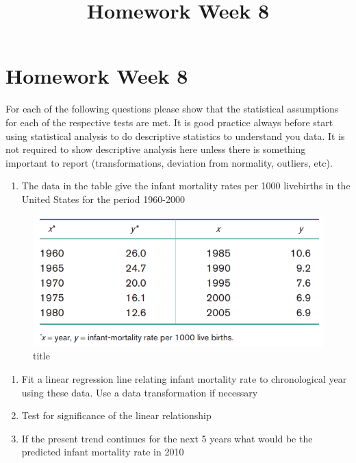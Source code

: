 \documentclass[11pt]{article}
\title{Homework Week 8}
\makeatletter
\def\maxwidth{\ifdim\Gin@nat@width>\linewidth\linewidth
    \else\Gin@nat@width\fi}
\let\Oldincludegraphics\includegraphics
\renewcommand{\includegraphics}[1]{\Oldincludegraphics[width=.8\maxwidth]{#1}}
\providecommand{\tightlist}{%
      \setlength{\itemsep}{0pt}\setlength{\parskip}{0pt}}
\makeatother
\begin{document}
    
    
    \maketitle
    
    

    
    \hypertarget{homework-week-8}{%
\section{Homework Week 8}\label{homework-week-8}}

For each of the following questions please show that the statistical
assumptions for each of the respective tests are met. It is good
practice always before start using statistical analysis to do
descriptive statistics to understand you data. It is not required to
show descriptive analysis here unless there is something important to
report (transformations, deviation from normality, outliers, etc).

    \begin{enumerate}
\def\labelenumi{\arabic{enumi}.}
\tightlist
\item
  The data in the table give the infant mortality rates per 1000
  livebirths in the United States for the period 1960-2000
\end{enumerate}

\begin{figure}
\centering
\includegraphics{HW1.png}
\caption{title}
\end{figure}

\begin{enumerate}
\def\labelenumi{\alph{enumi}.}
\item
  Fit a linear regression line relating infant mortality rate to
  chronological year using these data. Use a data transformation if
  necessary
\item
  Test for significance of the linear relationship
\item
  If the present trend continues for the next 5 years what would be the
  predicted infant mortality rate in 2010
\end{enumerate}
\end{document}
